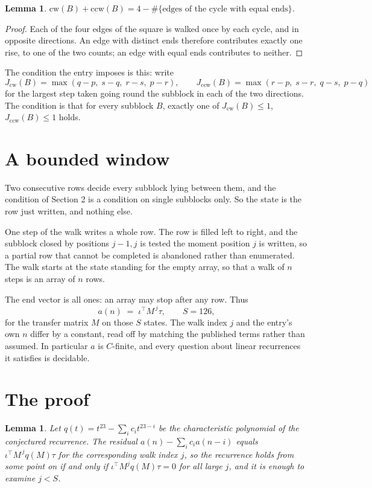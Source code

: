 \documentclass[11pt,a4paper]{article}
\theoremstyle{plain}
\newtheorem{lemma}[theorem]{Lemma}
\theoremstyle{definition}
\begin{document}
\begin{lemma}\label{lem:sum}
$\mathrm{cw}(B)+\mathrm{ccw}(B)=4-\#\{\text{edges of the cycle with equal ends}\}$.
\end{lemma}

\begin{proof}
Each of the four edges of the square is walked once by each cycle, and in opposite directions.
An edge with distinct ends therefore contributes exactly one rise, to one of the two counts;
an edge with equal ends contributes to neither.
\end{proof}

The condition the entry imposes is this: write
\[
J_{\mathrm{cw}}(B)=\max(q-p,\;s-q,\;r-s,\;p-r),\qquad J_{\mathrm{ccw}}(B)=\max(r-p,\;s-r,\;q-s,\;p-q)
\]
for the largest step taken going round the subblock in each of the two directions. The condition is that for every subblock $B$, exactly one of $J_{\mathrm{cw}}(B)\le 1$, $J_{\mathrm{ccw}}(B)\le 1$ holds.

\section{A bounded window}

Two consecutive rows decide every subblock lying between them, and the condition of Section 2 is a condition on single subblocks only. So the state is the row just written, and nothing else.

One step of the walk writes a whole row. The row is filled left to right, and the subblock
closed by positions $j-1,j$ is tested the moment position $j$ is written, so a partial row that
cannot be completed is abandoned rather than enumerated. The walk starts at the state standing
for the empty array, so that a walk of $n$ steps is an array of $n$ rows.

The end vector is all ones: an array may stop after any row. Thus
\[
a(n)\;=\;\iota^{\!\top}M^{\,j}\tau ,\qquad S=126,
\]
for the transfer matrix $M$ on those $S$ states. The walk index $j$ and the entry's own $n$
differ by a constant, read off by matching the published terms rather than assumed. In
particular $a$ is $C$-finite, and every question about linear recurrences it satisfies is
decidable.

\section{The proof}

\begin{lemma}\label{lem:crit}
Let $q(t)=t^{23}-\sum_i c_it^{23-i}$ be the characteristic polynomial of the
conjectured recurrence. The residual $a(n)-\sum_ic_ia(n-i)$ equals
$\iota^{\!\top}M^{\,j}q(M)\tau$ for the corresponding walk index $j$, so the recurrence
holds from some point on if and only if $\iota^{\!\top}M^{j}q(M)\tau=0$ for all large $j$,
and it is enough to examine $j<S$.
\end{lemma}
\end{document}
